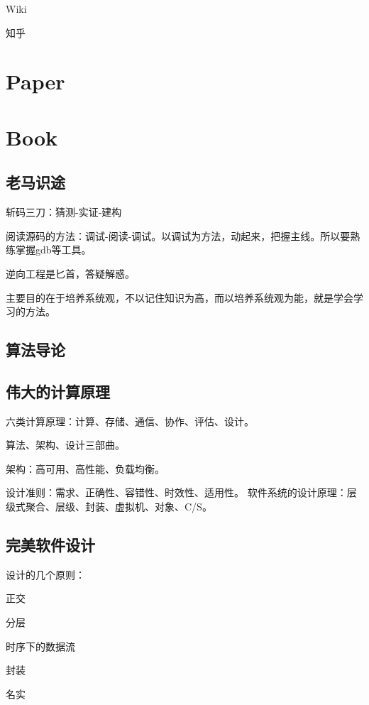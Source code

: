 \begin{enumbox}
\item Wiki
\item 知乎
\end{enumbox}

\section{Paper}

\section{Book}

\subsection{老马识途}

斩码三刀：猜测-实证-建构

阅读源码的方法：调试-阅读-调试。以调试为方法，动起来，把握主线。所以要熟练掌握gdb等工具。

逆向工程是匕首，答疑解惑。

主要目的在于培养系统观，不以记住知识为高，而以培养系统观为能，就是学会学习的方法。

\subsection{算法导论}

\subsection{伟大的计算原理}

六类计算原理：计算、存储、通信、协作、评估、设计。

算法、架构、设计三部曲。

架构：高可用、高性能、负载均衡。

设计准则：需求、正确性、容错性、时效性、适用性。
软件系统的设计原理：层级式聚合、层级、封装、虚拟机、对象、C/S。

\subsection{完美软件设计}

设计的几个原则：
\begin{enumbox}
\item 正交
\item 分层
\item 时序下的数据流
\item 封装
\item 名实
\end{enumbox}

